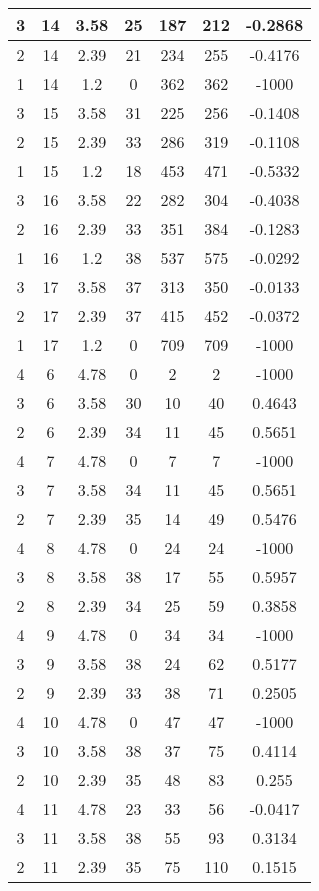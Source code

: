 \documentclass[letterpaper, 12pt]{article}
\begin{document}
\begin{longtable}{|c|c|c|c|c|c|c|}
\hline
3 & 14 & 3.58 & 25 & 187 & 212 & -0.2868 \\
\hline
2 & 14 & 2.39 & 21 & 234 & 255 & -0.4176 \\
\hline
1 & 14 & 1.2 & 0 & 362 & 362 & -1000 \\
\hline
3 & 15 & 3.58 & 31 & 225 & 256 & -0.1408 \\
\hline
2 & 15 & 2.39 & 33 & 286 & 319 & -0.1108 \\
\hline
1 & 15 & 1.2 & 18 & 453 & 471 & -0.5332 \\
\hline
3 & 16 & 3.58 & 22 & 282 & 304 & -0.4038 \\
\hline
2 & 16 & 2.39 & 33 & 351 & 384 & -0.1283 \\
\hline
1 & 16 & 1.2 & 38 & 537 & 575 & -0.0292 \\
\hline
3 & 17 & 3.58 & 37 & 313 & 350 & -0.0133 \\
\hline
2 & 17 & 2.39 & 37 & 415 & 452 & -0.0372 \\
\hline
1 & 17 & 1.2 & 0 & 709 & 709 & -1000 \\
\hline
4 & 6 & 4.78 & 0 & 2 & 2 & -1000 \\
\hline
3 & 6 & 3.58 & 30 & 10 & 40 & 0.4643 \\
\hline
2 & 6 & 2.39 & 34 & 11 & 45 & 0.5651 \\
\hline
4 & 7 & 4.78 & 0 & 7 & 7 & -1000 \\
\hline
3 & 7 & 3.58 & 34 & 11 & 45 & 0.5651 \\
\hline
2 & 7 & 2.39 & 35 & 14 & 49 & 0.5476 \\
\hline
4 & 8 & 4.78 & 0 & 24 & 24 & -1000 \\
\hline
3 & 8 & 3.58 & 38 & 17 & 55 & 0.5957 \\
\hline
2 & 8 & 2.39 & 34 & 25 & 59 & 0.3858 \\
\hline
4 & 9 & 4.78 & 0 & 34 & 34 & -1000 \\
\hline
3 & 9 & 3.58 & 38 & 24 & 62 & 0.5177 \\
\hline
2 & 9 & 2.39 & 33 & 38 & 71 & 0.2505 \\
\hline
4 & 10 & 4.78 & 0 & 47 & 47 & -1000 \\
\hline
3 & 10 & 3.58 & 38 & 37 & 75 & 0.4114 \\
\hline
2 & 10 & 2.39 & 35 & 48 & 83 & 0.255 \\
\hline
4 & 11 & 4.78 & 23 & 33 & 56 & -0.0417 \\
\hline
3 & 11 & 3.58 & 38 & 55 & 93 & 0.3134 \\
\hline
2 & 11 & 2.39 & 35 & 75 & 110 & 0.1515 \\

\end{longtable}
\end{document}
